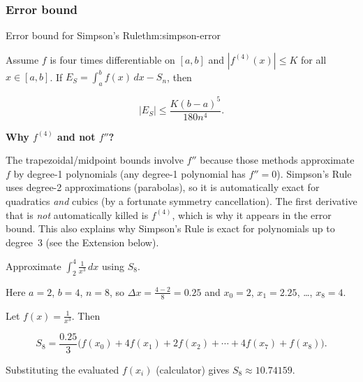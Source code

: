 \subsubsection*{Error bound}

\begin{theorem}{Error bound for Simpson's Rule}{thm:simpson-error}

Assume $f$ is four times differentiable on $[a,b]$ and $|f^{(4)}(x)|\le K$ for all $x\in[a,b]$. If $E_S=\int_a^b f(x)\,dx-S_n$, then

\[
|E_S| \le \frac{K(b-a)^5}{180n^4}.
\]

\end{theorem}

\textbf{Why $f^{(4)}$ and not $f''$?}

The trapezoidal/midpoint bounds involve $f''$ because those methods approximate $f$ by degree-1 polynomials (any degree-1 polynomial has $f''=0$). Simpson's Rule uses degree-2 approximations (parabolas), so it is automatically exact for quadratics \emph{and} cubics (by a fortunate symmetry cancellation). The first derivative that is \emph{not} automatically killed is $f^{(4)}$, which is why it appears in the error bound. This also explains why Simpson's Rule is exact for polynomials up to degree~3 (see the Extension below).

\begin{examplebox}[title={Worked Example: Simpson approximation with $n=8$}]

Approximate $\displaystyle\int_2^4\frac{1}{x^3}\,dx$ using $S_8$.

Here $a=2$, $b=4$, $n=8$, so $\Delta x=\frac{4-2}{8}=0.25$ and $x_0=2$, $x_1=2.25$, \ldots, $x_8=4$.

Let $f(x)=\frac{1}{x^3}$. Then

\[
S_8=\frac{0.25}{3}\Big(f(x_0)+4f(x_1)+2f(x_2)+\cdots+4f(x_7)+f(x_8)\Big).
\]

Substituting the evaluated $f(x_i)$ (calculator) gives $S_8\approx 10.74159$.

\end{examplebox}

